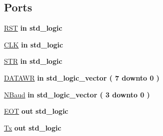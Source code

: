 \subsection*{Ports}
 \begin{DoxyCompactItemize}
\item 
\hyperlink{class_r_s232_write_a98682ef7de2714e5bab788a2e2ff1b7f}{R\+S\+T}  {\bfseries {\bfseries \textcolor{keywordflow}{in}\textcolor{vhdlchar}{ }}} {\bfseries \textcolor{comment}{std\+\_\+logic}\textcolor{vhdlchar}{ }} 
\item 
\hyperlink{class_r_s232_write_ab5d0ea9e968d49d94da9db07a979d402}{C\+L\+K}  {\bfseries {\bfseries \textcolor{keywordflow}{in}\textcolor{vhdlchar}{ }}} {\bfseries \textcolor{comment}{std\+\_\+logic}\textcolor{vhdlchar}{ }} 
\item 
\hyperlink{class_r_s232_write_a2362aafea593a78b601ede05bb71edd7}{S\+T\+R}  {\bfseries {\bfseries \textcolor{keywordflow}{in}\textcolor{vhdlchar}{ }}} {\bfseries \textcolor{comment}{std\+\_\+logic}\textcolor{vhdlchar}{ }} 
\item 
\hyperlink{class_r_s232_write_a7671d0cfbe49b836aa8bfd98c0477dfa}{D\+A\+T\+A\+W\+R}  {\bfseries {\bfseries \textcolor{keywordflow}{in}\textcolor{vhdlchar}{ }}} {\bfseries \textcolor{comment}{std\+\_\+logic\+\_\+vector}\textcolor{vhdlchar}{ }\textcolor{vhdlchar}{(}\textcolor{vhdlchar}{ }\textcolor{vhdlchar}{ } \textcolor{vhdldigit}{7} \textcolor{vhdlchar}{ }\textcolor{keywordflow}{downto}\textcolor{vhdlchar}{ }\textcolor{vhdlchar}{ } \textcolor{vhdldigit}{0} \textcolor{vhdlchar}{ }\textcolor{vhdlchar}{)}\textcolor{vhdlchar}{ }} 
\item 
\hyperlink{class_r_s232_write_af99e9846fb1525d8781a8861c5405ac6}{N\+Baud}  {\bfseries {\bfseries \textcolor{keywordflow}{in}\textcolor{vhdlchar}{ }}} {\bfseries \textcolor{comment}{std\+\_\+logic\+\_\+vector}\textcolor{vhdlchar}{ }\textcolor{vhdlchar}{(}\textcolor{vhdlchar}{ }\textcolor{vhdlchar}{ } \textcolor{vhdldigit}{3} \textcolor{vhdlchar}{ }\textcolor{keywordflow}{downto}\textcolor{vhdlchar}{ }\textcolor{vhdlchar}{ } \textcolor{vhdldigit}{0} \textcolor{vhdlchar}{ }\textcolor{vhdlchar}{)}\textcolor{vhdlchar}{ }} 
\item 
\hyperlink{class_r_s232_write_a7b083766046f96c99b2889ae0e824ca4}{E\+O\+T}  {\bfseries {\bfseries \textcolor{keywordflow}{out}\textcolor{vhdlchar}{ }}} {\bfseries \textcolor{comment}{std\+\_\+logic}\textcolor{vhdlchar}{ }} 
\item 
\hyperlink{class_r_s232_write_a447d59a050c4bcc20d40ab5c940b17dd}{Tx}  {\bfseries {\bfseries \textcolor{keywordflow}{out}\textcolor{vhdlchar}{ }}} {\bfseries \textcolor{comment}{std\+\_\+logic}\textcolor{vhdlchar}{ }} 
\end{DoxyCompactItemize}


